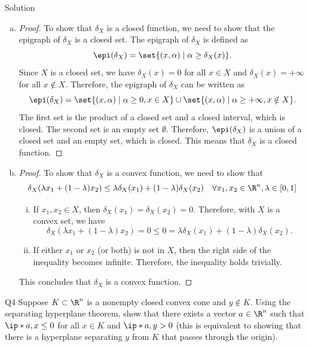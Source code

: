 \documentclass{article}
\theoremstyle{plain}
\theoremstyle{definition}
\theoremstyle{remark}
\begin{document}
\begin{solution}
    {Solution}
    \begin{enumerate}[(a)]
        \item {
            \begin{proof}
                To show that $\delta_X$ is a closed function, we need to show that the epigraph of $\delta_X$ is a closed set. The epigraph of $\delta_X$ is defined as
                \[
                    \epi(\delta_X) = \set{(x, \alpha) \mid \alpha \geq \delta_X(x)}.
                \]
                Since $X$ is a closed set, we have $\delta_X(x)=0$ for all $x\in X$ and $\delta_X(x)=+\infty$ for all $x\notin X$. Therefore, the epigraph of $\delta_X$ can be written as
                \[
                    \epi(\delta_X) = \set{(x, \alpha) \mid \alpha \geq 0, x\in X} \cup \set{(x, \alpha) \mid \alpha \geq +\infty, x\notin X}.
                \]
                The first set is the product of a closed set and a closed interval, which is closed. The second set is an empty set $\emptyset$. Therefore, $\epi(\delta_X)$ is a union of a closed set and an empty set, which is closed. This means that $\delta_X$ is a closed function.
            \end{proof}
        }
        \item {
            \begin{proof}
                To show that $\delta_X$ is a convex function, we need to show that \[\delta_X(\lambda x_1+(1-\lambda)x_2)\leq\lambda\delta_X(x_1)+(1-\lambda)\delta_X(x_2) \quad \forall x_1, x_2\in \R^n, \lambda\in[0,1]\]
                \begin{enumerate}[(i)]
                    \item If $x_1, x_2\in X$, then $\delta_X(x_1)=\delta_X(x_2)=0$. Therefore, with $X$ is a convex set, we have \[\delta_X(\lambda x_1+(1-\lambda)x_2)=0\leq 0=\lambda\delta_X(x_1)+(1-\lambda)\delta_X(x_2).\]
                    \item If either $x_1$ or $x_2$ (or both) is not in $X$, then the right side of the inequality becomes infinite. Therefore, the inequality holds trivially.
                \end{enumerate}
                This concludes that $\delta_X$ is a convex function.
            \end{proof}
        }
    \end{enumerate}
\end{solution}

\begin{problem}
    {Q4}
    Suppose $K\subset\R^n$ is a nonempty closed convex cone and $y\notin K$. Using the separating hyperplane theorem, show that there exists a vector $a\in \R^n$ such that $\ip*{a,x}\leq 0$ for all $x\in K$ and $\ip*{a,y}>0$ (this is equivalent to showing that there is a hyperplane separating $y$ from $K$ that passes through the origin).
\end{problem}
\end{document}
